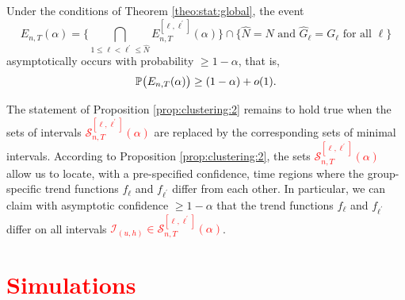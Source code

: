 \documentclass[a4paper,12pt]{article}
\begin{document}
{\color{red}\begin{prop}\label{prop:clustering:2}
Under the conditions of Theorem \ref{theo:stat:global}, the event 
\[ E_{n,T}(\alpha) = \Big\{ \bigcap_{1 \le \ell < \ell^\prime \le \widehat{N}} E_{n,T}^{[\ell,\ell^\prime]}(\alpha) \Big\} \cap \Big\{ \widehat{N} = N \text{ and } \widehat{G}_\ell = G_\ell \text{ for all } \ell \Big\} \]
asymptotically occurs with probability $\ge 1-\alpha$, that is, 
\[ \mathbb{P} \big( E_{n,T}(\alpha) \big) \ge (1 - \alpha) + o(1). \]
\end{prop}}
The statement of Proposition \ref{prop:clustering:2} remains to hold true when the sets of intervals %
\textcolor{red}{$\mathcal{S}^{[\ell,\ell^\prime]}_{n, T}(\alpha)$} are replaced by the corresponding sets of minimal intervals. According to Proposition \ref{prop:clustering:2}, the sets %
\textcolor{red}{$\mathcal{S}^{[\ell,\ell^\prime]}_{n, T}(\alpha)$} allow us to locate, with a pre-specified confidence, time regions where the group-specific trend functions $f_\ell$ and $f_{\ell^\prime}$ differ from each other. In particular, we can claim with asymptotic confidence $\ge 1 - \alpha$ that the trend functions $f_\ell$ and $f_{\ell^\prime}$ differ on all intervals \textcolor{red}{$\mathcal{I}_{(u, h)} \in \mathcal{S}^{[\ell,\ell^\prime]}_{n, T}(\alpha)$}. %

\section{\textcolor{red}{Simulations}}\label{sec:sim}
\end{document}
